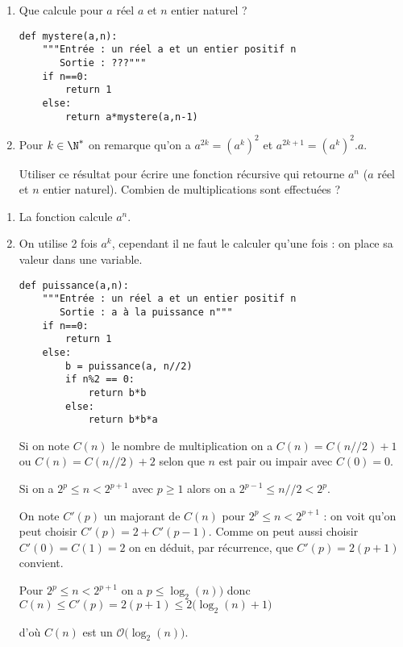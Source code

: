\begin{Exercise}[title = Exponentiation]

\begin{enumerate}
  \item Que calcule  pour $a$ réel $a$ et $n$ entier naturel ?
\begin{lstlisting}
def mystere(a,n):
    """Entrée : un réel a et un entier positif n
       Sortie : ???"""
    if n==0:
        return 1
    else:
        return a*mystere(a,n-1)
\end{lstlisting}
 \medskip
 
\item Pour $k\in\N^* $ on remarque qu'on a $a^{2k}=(a^k)^2$ et $a^{2k+1}=(a^k)^2.a$. 

Utiliser ce résultat pour écrire une fonction récursive  qui retourne $a^n$ ($a$ réel et $n$ entier naturel). 
Combien de multiplications sont effectuées ?
\end{enumerate}
\end{Exercise}
\begin{Answer}
\begin{enumerate}
\item La fonction calcule $a^n$.
\item On utilise 2 fois $a^k$, cependant il ne faut le calculer qu'une fois : on place sa valeur dans une variable. 
\begin{lstlisting}
def puissance(a,n):
    """Entrée : un réel a et un entier positif n
       Sortie : a à la puissance n"""
    if n==0:
        return 1
    else:
        b = puissance(a, n//2)
        if n%2 == 0:
            return b*b
        else:
            return b*b*a
\end{lstlisting} 
Si on note $C(n)$ le nombre de multiplication on a $C(n)=C(n//2) +1$ ou $C(n)=C(n//2) +2$ selon que $n$ est pair ou impair avec $C(0)=0$.

Si on a $2^p \le n < 2^{p+1}$ avec $p\ge 1$ alors on a $2^{p-1} \le n//2 < 2^p$.

On note $C'(p)$ un majorant de $C(n)$ pour $2^p \le n < 2^{p+1}$ : on voit qu'on peut choisir $C'(p) = 2 + C'(p-1)$. Comme on peut aussi choisir $C'(0)=C(1)=2$ on en déduit, par récurrence, que $C'(p)=2(p+1)$ convient.

Pour $2^p \le n < 2^{p+1}$ on a $p \le \log_2(n)\bigr)$ donc 
$C(n) \le C'(p) =2(p+1)\le 2\bigl(\log_2(n)+1\bigr)$ 

d'où $C(n)$ est un ${\mathcal O}\bigl(\log_2(n)\bigr)$.
\end{enumerate}
\end{Answer}
